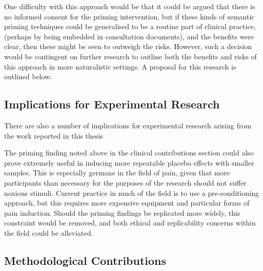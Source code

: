 One difficulty with this approach would be that it could be argued
that there is no informed consent for the priming intervention, but if
these kinds of semantic priming techniques could be generalised to be
a routine part of clinical practice, (perhaps by being embedded in
consultation documents), and the benefits were clear, then these might
be seen to outweigh the risks. However, such a decision would be
contingent on further research to outline both the benefits and risks
of this approach in more naturalistic settings. A proposal for this
research is outlined below.


\subsection{Implications for Experimental Research}
\label{sec:impl-exper-rese}

There are also a number of implications for experimental research
arising from the work reported in this thesis

The priming finding noted above in the clinical contributions section
could also prove extremely useful in inducing more repeatable placebo
effects with smaller samples. This is especially germane in the field
of pain, given that more participants than necessary for the purposes
of the research should not suffer noxious stimuli. Current practice in
much of the field is to use a pre-conditioning approach, but this
requires more expensive equipment and particular forms of pain
induction. Should the priming findings be replicated more widely, this
constraint would be removed, and both ethical and replicability
concerns within the field could be alleviated.



\subsection{Methodological Contributions}
\label{sec:meth-contr}

